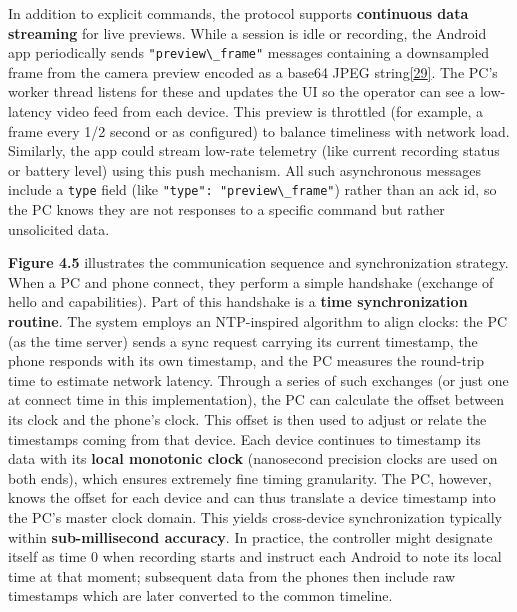 \documentclass[12pt,a4paper]{article}
\begin{document}
In addition to explicit commands, the protocol supports \textbf{continuous data streaming} for live previews. While a session is idle or recording, the Android app periodically sends \passthrough{\lstinline!"preview\_frame"!} messages containing a downsampled frame from the camera preview encoded as a base64 JPEG string\href{https://github.com/buccancs/GSR-Dual-Video-System/blob/05ae360cb7b4ae7c7861f72deb235ad64a74b38e/pc_controller/src/main/main.py\#L64-L72}{{[}29{]}}. The PC's worker thread listens for these and updates the UI so the operator can see a low-latency video feed from each device. This preview is throttled (for example, a frame every 1/2 second or as configured) to balance timeliness with network load. Similarly, the app could stream low-rate telemetry (like current recording status or battery level) using this push mechanism. All such asynchronous messages include a \passthrough{\lstinline!type!} field (like \passthrough{\lstinline!"type": "preview\_frame"!}) rather than an ack id, so the PC knows they are not responses to a specific command but rather unsolicited data.

\textbf{Figure 4.5} illustrates the communication sequence and synchronization strategy. When a PC and phone connect, they perform a simple handshake (exchange of hello and capabilities). Part of this handshake is a \textbf{time synchronization routine}. The system employs an NTP-inspired algorithm to align clocks: the PC (as the time server) sends a sync request carrying its current timestamp, the phone responds with its own timestamp, and the PC measures the round-trip time to estimate network latency. Through a series of such exchanges (or just one at connect time in this implementation), the PC can calculate the offset between its clock and the phone's clock. This offset is then used to adjust or relate the timestamps coming from that device. Each device continues to timestamp its data with its \textbf{local monotonic clock} (nanosecond precision clocks are used on both ends), which ensures extremely fine timing granularity. The PC, however, knows the offset for each device and can thus translate a device timestamp into the PC's master clock domain. This yields cross-device synchronization typically within \textbf{sub-millisecond accuracy}. In practice, the controller might designate itself as time 0 when recording starts and instruct each Android to note its local time at that moment; subsequent data from the phones then include raw timestamps which are later converted to the common timeline.
\end{document}

